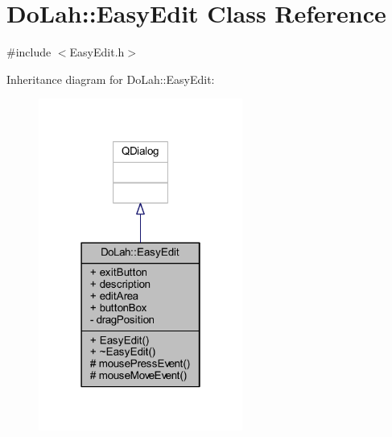 \hypertarget{class_do_lah_1_1_easy_edit}{}\section{Do\+Lah\+:\+:Easy\+Edit Class Reference}
\label{class_do_lah_1_1_easy_edit}


{\ttfamily \#include $<$Easy\+Edit.\+h$>$}



Inheritance diagram for Do\+Lah\+:\+:Easy\+Edit\+:
\nopagebreak
\begin{figure}[H]
\begin{center}
\leavevmode
\includegraphics[width=190pt]{class_do_lah_1_1_easy_edit__inherit__graph}
\end{center}
\end{figure}


